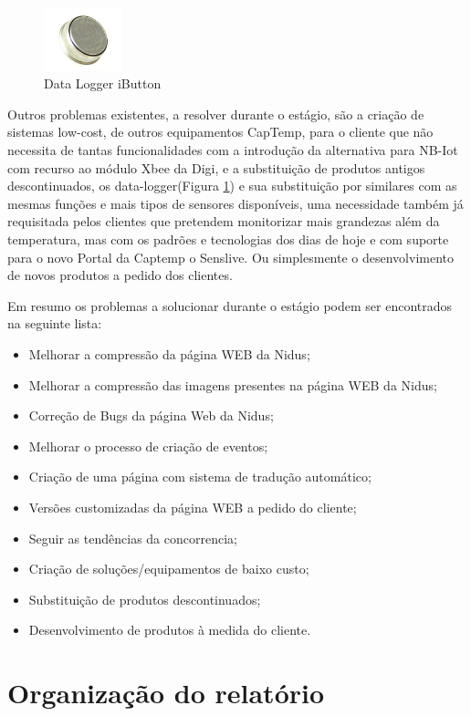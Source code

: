 \begin{figure}[htb]
  \centering
  \includegraphics[width=0.20\textwidth]{images/ds1921.jpg}
  \caption{Data Logger iButton}\label{ds1921}
\end{figure}
Outros problemas existentes, a resolver durante o estágio, são a criação de sistemas low-cost, de outros equipamentos CapTemp, para o cliente que não necessita de tantas funcionalidades com a introdução da alternativa para NB-Iot com recurso ao módulo Xbee da Digi, e a substituição de produtos antigos descontinuados, os data-logger(Figura \ref{ds1921}) e sua substituição por similares com as mesmas funções e mais tipos de sensores disponíveis, uma necessidade também já requisitada pelos clientes que pretendem monitorizar mais grandezas além da temperatura, mas com os padrões e tecnologias dos dias de hoje e com suporte para o novo Portal da Captemp o Senslive. Ou simplesmente o desenvolvimento de novos produtos a pedido dos clientes.

\par
Em resumo os problemas a solucionar durante o estágio podem ser encontrados na seguinte lista:
\begin{itemize}
\item Melhorar a compressão da página WEB da Nidus;
\item Melhorar a compressão das imagens presentes na página WEB da Nidus;
\item Correção de Bugs da página Web da Nidus;
\item Melhorar o processo de criação de eventos;
\item Criação de uma página com sistema de tradução automático;
\item Versões customizadas da página WEB a pedido do cliente;
\item Seguir as tendências da concorrencia;
\item Criação de soluções/equipamentos de baixo custo;
\item Substituição de produtos descontinuados;
\item Desenvolvimento  de produtos à medida do cliente.
\end{itemize}

\section{Organização do relatório}

